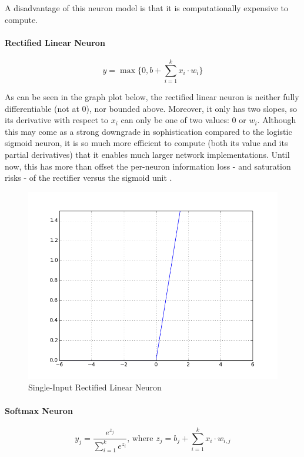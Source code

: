 \documentclass[a4paper,11pt]{article}
\begin{document}
A disadvantage of this neuron model is that it is computationally expensive to compute.
                
\paragraph{Rectified Linear Neuron}
\begin{equation}
\label{relu}
y = \max\{0, b + \sum\limits_{i=1}^k x_{i}\cdot w_{i}\}
\end{equation}

As can be seen in the graph plot below, the rectified linear neuron is neither fully differentiable (not at $0$), nor bounded above. 
Moreover, it only has two slopes, so its derivative with respect to $x_{i}$ can only be one of two values: $0$ or $w_{i}$. Although this may come as a strong downgrade in sophistication compared to the logistic sigmoid neuron, it is so much more efficient to compute (both its value and its partial derivatives) that it enables much larger network implementations\cite{krizhevsky}. Until now, this has more than offset the per-neuron information loss - and saturation risks - of the rectifier versus the sigmoid unit \cite{rectifier}.

\begin{figure}[h!]
	\centering
	\includegraphics[scale=0.5]{images/ReLU.png}
	\caption{Single-Input Rectified Linear Neuron}
\end{figure}

\paragraph{Softmax Neuron}
\begin{equation}
\label{}
y_{j} = \frac{e^{z_{j}}}{\sum\limits_{i=1}^k e^{z_{i}}} \text{, where } z_{j} = b_{j} + \sum\limits_{i=1}^k x_{i}\cdot w_{i,j}
\end{equation}
\end{document}
